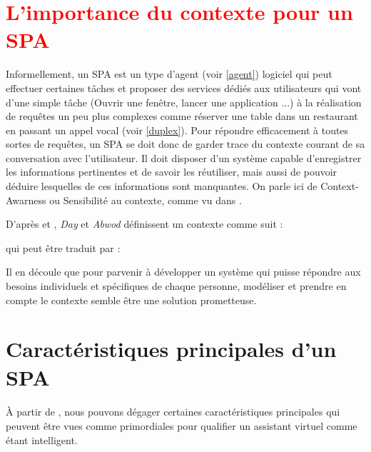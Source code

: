 \section{\textcolor{red}{L'importance du contexte pour un SPA}}\label{spa-def}
Informellement, un SPA est un type d'agent (voir \ref{agent}) logiciel qui peut effectuer certaines tâches et proposer des services dédiés aux utilisateurs qui vont d'une simple tâche (Ouvrir une fenêtre, lancer une application ...) à la réalisation de requêtes un peu plus complexes comme réserver une table dans un restaurant en passant un appel vocal (voir \ref{duplex}). Pour répondre efficacement à toutes sortes de requêtes, un SPA se doit donc de garder trace du contexte courant de sa conversation avec l'utilisateur. Il doit disposer d'un système capable d'enregistrer les informations pertinentes et de savoir les réutiliser, mais aussi de pouvoir déduire lesquelles de ces informations sont manquantes. On parle ici de Context-Awarness ou Sensibilité au contexte, comme vu dans \cite{SPA-overview}.
\par D'après \cite{SPA-overview} et \cite{Dey-Abwod},
\textit{Day} et \textit{Abwod} définissent un contexte comme suit : 
\begin{quote}\label{context-def}
\end{quote}
qui peut être traduit par :
\begin{quote}\label{context-def-fr}
\end{quote}
Il en découle que pour parvenir à développer un système qui puisse répondre aux besoins individuels et spécifiques de chaque personne, modéliser et prendre en compte le contexte semble être une solution prometteuse.



\section{Caractéristiques principales d'un SPA}
\paragraph{}
À partir de \cite{SPA-overview}, nous pouvons dégager certaines caractéristiques principales qui peuvent être vues comme primordiales pour qualifier un assistant virtuel comme étant intelligent.
